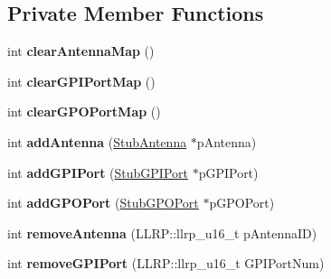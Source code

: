 \subsection*{Private Member Functions}
\begin{DoxyCompactItemize}
\item 
\hypertarget{class_e_l_f_i_n_1_1_stub_reader_a3b29567f2afe8f9883d0388d9a3a154c}{int {\bfseries clear\-Antenna\-Map} ()}\label{class_e_l_f_i_n_1_1_stub_reader_a3b29567f2afe8f9883d0388d9a3a154c}

\item 
\hypertarget{class_e_l_f_i_n_1_1_stub_reader_adf5778c462c27ad1455d135011ca393a}{int {\bfseries clear\-G\-P\-I\-Port\-Map} ()}\label{class_e_l_f_i_n_1_1_stub_reader_adf5778c462c27ad1455d135011ca393a}

\item 
\hypertarget{class_e_l_f_i_n_1_1_stub_reader_ac3266aef0e06544eb058fe10f86c96ec}{int {\bfseries clear\-G\-P\-O\-Port\-Map} ()}\label{class_e_l_f_i_n_1_1_stub_reader_ac3266aef0e06544eb058fe10f86c96ec}

\item 
\hypertarget{class_e_l_f_i_n_1_1_stub_reader_a0df240ae07622eed5f37beeab3450b9b}{int {\bfseries add\-Antenna} (\hyperlink{class_e_l_f_i_n_1_1_stub_antenna}{Stub\-Antenna} $\ast$p\-Antenna)}\label{class_e_l_f_i_n_1_1_stub_reader_a0df240ae07622eed5f37beeab3450b9b}

\item 
\hypertarget{class_e_l_f_i_n_1_1_stub_reader_a61c4cb7b35862acbbbe9ef63a12a9be4}{int {\bfseries add\-G\-P\-I\-Port} (\hyperlink{class_e_l_f_i_n_1_1_stub_g_p_i_port}{Stub\-G\-P\-I\-Port} $\ast$p\-G\-P\-I\-Port)}\label{class_e_l_f_i_n_1_1_stub_reader_a61c4cb7b35862acbbbe9ef63a12a9be4}

\item 
\hypertarget{class_e_l_f_i_n_1_1_stub_reader_a663a755e21651fe73c5a0247e74ee13a}{int {\bfseries add\-G\-P\-O\-Port} (\hyperlink{class_e_l_f_i_n_1_1_stub_g_p_o_port}{Stub\-G\-P\-O\-Port} $\ast$p\-G\-P\-O\-Port)}\label{class_e_l_f_i_n_1_1_stub_reader_a663a755e21651fe73c5a0247e74ee13a}

\item 
\hypertarget{class_e_l_f_i_n_1_1_stub_reader_a0d4329a9ba17d36de2e38ce55644f830}{int {\bfseries remove\-Antenna} (L\-L\-R\-P\-::llrp\-\_\-u16\-\_\-t p\-Antenna\-I\-D)}\label{class_e_l_f_i_n_1_1_stub_reader_a0d4329a9ba17d36de2e38ce55644f830}

\item 
\hypertarget{class_e_l_f_i_n_1_1_stub_reader_a94d6de20c751367c293151be7ff34cad}{int {\bfseries remove\-G\-P\-I\-Port} (L\-L\-R\-P\-::llrp\-\_\-u16\-\_\-t G\-P\-I\-Port\-Num)}\label{class_e_l_f_i_n_1_1_stub_reader_a94d6de20c751367c293151be7ff34cad}


\end{DoxyCompactItemize}
